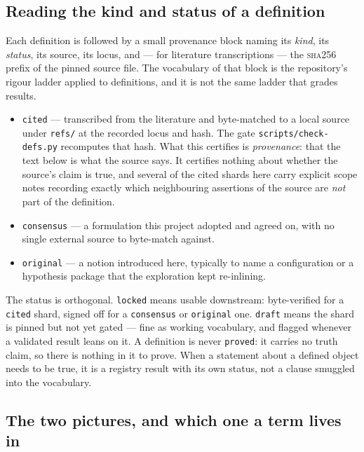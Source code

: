 \subsection*{Reading the kind and status of a definition}

Each definition is followed by a small provenance block naming its \emph{kind}, its
\emph{status}, its source, its locus, and --- for literature transcriptions --- the
\textsc{sha256} prefix of the pinned source file. The vocabulary of that block is the
repository's rigour ladder applied to definitions, and it is not the same ladder that
grades results.

\begin{itemize}
\item \texttt{cited} --- transcribed from the literature and byte-matched to a local source
  under \texttt{refs/} at the recorded locus and hash. The gate
  \texttt{scripts/check-defs.py} recomputes that hash. What this certifies is
  \emph{provenance}: that the text below is what the source says. It certifies nothing
  about whether the source's claim is true, and several of the cited shards here carry
  explicit scope notes recording exactly which neighbouring assertions of the source are
  \emph{not} part of the definition.
\item \texttt{consensus} --- a formulation this project adopted and agreed on, with no
  single external source to byte-match against.
\item \texttt{original} --- a notion introduced here, typically to name a configuration or
  a hypothesis package that the exploration kept re-inlining.
\end{itemize}

\noindent The status is orthogonal. \texttt{locked} means usable downstream: byte-verified
for a \texttt{cited} shard, signed off for a \texttt{consensus} or \texttt{original} one.
\texttt{draft} means the shard is pinned but not yet gated --- fine as working vocabulary,
and flagged whenever a validated result leans on it. A definition is never
\texttt{proved}: it carries no truth claim, so there is nothing in it to prove. When a
statement about a defined object needs to be true, it is a registry result with its own
status, not a clause smuggled into the vocabulary.

\subsection*{The two pictures, and which one a term lives in}

